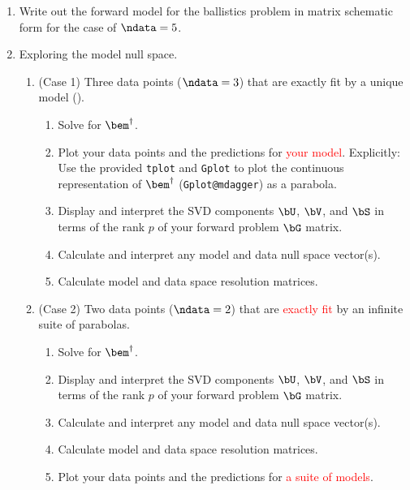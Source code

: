 \documentclass[11pt,titlepage,fleqn]{article}
\begin{document}
%
\begin{enumerate}
\item Write out the forward model for the ballistics problem in matrix schematic form for the case of $\ndata=5$.

\item Exploring the model null space.

\begin{enumerate}
\item (Case 1) Three data points ($\ndata = 3$) that are exactly fit by a unique model ().
%
\begin{enumerate}
\item Solve for $\bem^\dagger$.
\item Plot your data points and the predictions for \textcolor{red}{your model}.
Explicitly: Use the provided \verb+tplot+ and \verb+Gplot+ to plot the continuous representation of $\bem^\dagger$ (\ie \verb+Gplot@mdagger+) as a parabola.
\item Display and interpret the SVD components $\bU$, $\bV$, and $\bS$ in terms of the rank $p$ of your forward problem $\bG$ matrix.
\item Calculate and interpret any model and data null space vector(s).
\item Calculate model and data space resolution matrices.
\end{enumerate}

\item (Case 2) Two data points ($\ndata = 2$) that are \textcolor{red}{exactly fit} by an infinite suite of parabolas.
%
\begin{enumerate}
\item Solve for $\bem^\dagger$.
\item Display and interpret the SVD components $\bU$, $\bV$, and $\bS$ in terms of the rank $p$ of your forward problem $\bG$ matrix.
\item Calculate and interpret any model and data null space vector(s).
\item Calculate model and data space resolution matrices.
\item Plot your data points and the predictions for \textcolor{red}{a suite of models}.
\end{enumerate}


\end{enumerate}
\end{enumerate}
\end{document}
